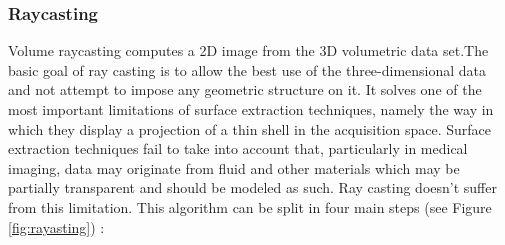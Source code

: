 \subsubsection{Raycasting}
Volume raycasting computes a 2D image from the 3D volumetric data set.The basic goal of ray casting is to allow the best use of the three-dimensional data and not attempt to impose any geometric structure on it. It solves one of the most important limitations of surface extraction techniques, namely the way in which they display a projection of a thin shell in the acquisition space. Surface extraction techniques fail to take into account that, particularly in medical imaging, data may originate from fluid and other materials which may be partially transparent and should be modeled as such. Ray casting doesn't suffer from this limitation. This algorithm can be split in four main steps (see Figure \ref{fig:rayasting}) :
